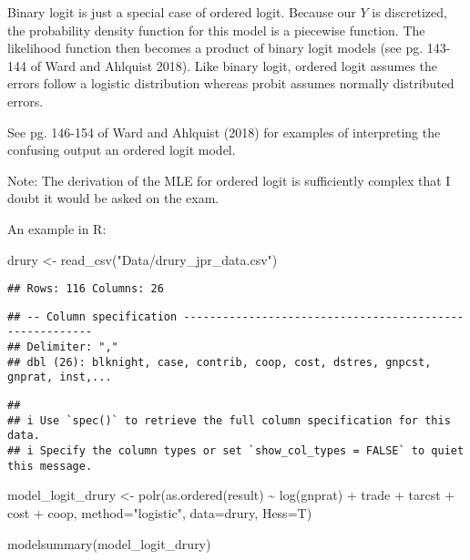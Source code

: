 \documentclass[
]{article}
\newenvironment{Shaded}{\begin{snugshade}}{\end{snugshade}}
\newcommand{\AttributeTok}[1]{\textcolor[rgb]{0.77,0.63,0.00}{#1}}
\newcommand{\FunctionTok}[1]{\textcolor[rgb]{0.00,0.00,0.00}{#1}}
\newcommand{\NormalTok}[1]{#1}
\newcommand{\OtherTok}[1]{\textcolor[rgb]{0.56,0.35,0.01}{#1}}
\newcommand{\SpecialCharTok}[1]{\textcolor[rgb]{0.00,0.00,0.00}{#1}}
\newcommand{\StringTok}[1]{\textcolor[rgb]{0.31,0.60,0.02}{#1}}
\begin{document}
Binary logit is just a special case of ordered logit. Because our \(Y\)
is discretized, the probability density function for this model is a
piecewise function. The likelihood function then becomes a product of
binary logit models (see pg. 143-144 of Ward and Ahlquist 2018). Like
binary logit, ordered logit assumes the errors follow a logistic
distribution whereas probit assumes normally distributed errors.

See pg. 146-154 of Ward and Ahlquist (2018) for examples of interpreting
the confusing output an ordered logit model.

Note: The derivation of the MLE for ordered logit is sufficiently
complex that I doubt it would be asked on the exam.

An example in R:

\begin{Shaded}
\begin{Highlighting}[]
\NormalTok{drury }\OtherTok{\textless{}{-}} \FunctionTok{read\_csv}\NormalTok{(}\StringTok{"Data/drury\_jpr\_data.csv"}\NormalTok{)}
\end{Highlighting}
\end{Shaded}

\begin{verbatim}
## Rows: 116 Columns: 26
\end{verbatim}

\begin{verbatim}
## -- Column specification --------------------------------------------------------
## Delimiter: ","
## dbl (26): blknight, case, contrib, coop, cost, dstres, gnpcst, gnprat, inst,...
\end{verbatim}

\begin{verbatim}
## 
## i Use `spec()` to retrieve the full column specification for this data.
## i Specify the column types or set `show_col_types = FALSE` to quiet this message.
\end{verbatim}

\begin{Shaded}
\begin{Highlighting}[]
\NormalTok{model\_logit\_drury }\OtherTok{\textless{}{-}} \FunctionTok{polr}\NormalTok{(}\FunctionTok{as.ordered}\NormalTok{(result) }\SpecialCharTok{\textasciitilde{}} \FunctionTok{log}\NormalTok{(gnprat) }\SpecialCharTok{+}\NormalTok{ trade }\SpecialCharTok{+}\NormalTok{ tarcst }\SpecialCharTok{+}\NormalTok{ cost }\SpecialCharTok{+}\NormalTok{ coop, }
                   \AttributeTok{method=}\StringTok{"logistic"}\NormalTok{, }\AttributeTok{data=}\NormalTok{drury, }\AttributeTok{Hess=}\NormalTok{T)}

\FunctionTok{modelsummary}\NormalTok{(model\_logit\_drury)}
\end{Highlighting}
\end{Shaded}
\end{document}
